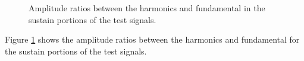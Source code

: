 \begin{figure}[h!]
			\quad
			\caption{Amplitude ratios between the harmonics and fundamental in the sustain
				 portions of the test signals.}
			\label{fig:SustainAmplitudes}
		\end{figure}

		Figure \ref{fig:SustainAmplitudes} shows the amplitude ratios between the harmonics and fundamental for the
		sustain portions of the test signals.


